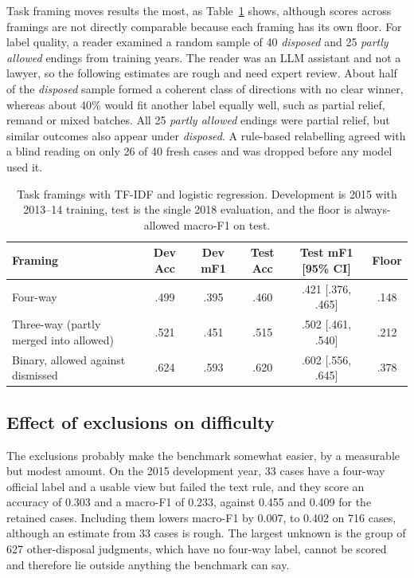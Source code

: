 \documentclass[11pt,a4paper]{article}
\newcommand{\cls}[1]{\emph{#1}}
\begin{document}
Task framing moves results the most, as Table~\ref{tab:framing} shows, although scores across framings are not directly comparable because each framing has its own floor. For label quality, a reader examined a random sample of 40 \cls{disposed} and 25 \cls{partly allowed} endings from training years. The reader was an LLM assistant and not a lawyer, so the following estimates are rough and need expert review. About half of the \cls{disposed} sample formed a coherent class of directions with no clear winner, whereas about 40\% would fit another label equally well, such as partial relief, remand or mixed batches. All 25 \cls{partly allowed} endings were partial relief, but similar outcomes also appear under \cls{disposed}. A rule-based relabelling agreed with a blind reading on only 26 of 40 fresh cases and was dropped before any model used it.

\begin{table}[t]\centering\small
\setlength{\tabcolsep}{4pt}
\caption{Task framings with TF-IDF and logistic regression. Development is 2015 with 2013--14 training, test is the single 2018 evaluation, and the floor is always-allowed macro-F1 on test.}\label{tab:framing}
\begin{tabular}{@{}lccccc@{}}\toprule
Framing & Dev Acc & Dev mF1 & Test Acc & Test mF1 [95\% CI] & Floor\\\midrule
Four-way & .499 & .395 & .460 & .421 [.376, .465] & .148\\
Three-way (partly merged into allowed) & .521 & .451 & .515 & .502 [.461, .540] & .212\\
Binary, allowed against dismissed & .624 & .593 & .620 & .602 [.556, .645] & .378\\\bottomrule
\end{tabular}\end{table}

\subsection{Effect of exclusions on difficulty}\label{sec:res-exclusions}
The exclusions probably make the benchmark somewhat easier, by a measurable but modest amount. On the 2015 development year, 33 cases have a four-way official label and a usable view but failed the text rule, and they score an accuracy of 0.303 and a macro-F1 of 0.233, against 0.455 and 0.409 for the retained cases. Including them lowers macro-F1 by 0.007, to 0.402 on 716 cases, although an estimate from 33 cases is rough. The largest unknown is the group of 627 other-disposal judgments, which have no four-way label, cannot be scored and therefore lie outside anything the benchmark can say.
\end{document}
